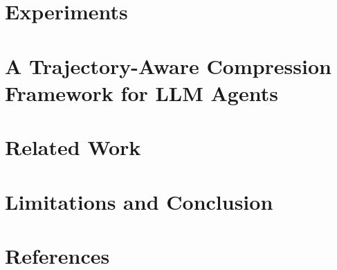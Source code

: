 \documentclass{article}
\begin{document}
\section{Experiments}


\section{A Trajectory-Aware Compression Framework for LLM Agents}


\section{Related Work}


\section{Limitations and Conclusion}


\begin{ack}
\end{ack}

\section*{References}
\end{document}
